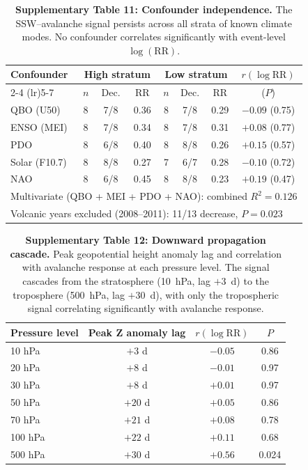 \begin{table}[!ht]
\centering
\caption{\textbf{Supplementary Table 11: Confounder independence.}
The SSW--avalanche signal persists across all strata of known climate modes. No confounder correlates significantly with event-level $\log(\mathrm{RR})$.}
\label{tab:confounders}
\small
\begin{tabular}{lccccccc}
\toprule
Confounder & \multicolumn{3}{c}{High stratum} & \multicolumn{3}{c}{Low stratum} & $r(\log\mathrm{RR})$ \\
\cmidrule(lr){2-4} \cmidrule(lr){5-7}
 & $n$ & Dec. & RR & $n$ & Dec. & RR & ($P$) \\
\midrule
QBO (U50) & 8 & 7/8 & 0.36 & 8 & 7/8 & 0.29 & $-0.09$ (0.75) \\
ENSO (MEI) & 8 & 7/8 & 0.34 & 8 & 7/8 & 0.31 & $+0.08$ (0.77) \\
PDO & 8 & 6/8 & 0.40 & 8 & 8/8 & 0.26 & $+0.15$ (0.57) \\
Solar (F10.7) & 8 & 8/8 & 0.27 & 7 & 6/7 & 0.28 & $-0.10$ (0.72) \\
NAO & 8 & 6/8 & 0.45 & 8 & 8/8 & 0.23 & $+0.19$ (0.47) \\
\midrule
\multicolumn{8}{l}{Multivariate (QBO + MEI + PDO + NAO): combined $R^2 = 0.126$} \\
\multicolumn{8}{l}{Volcanic years excluded (2008--2011): 11/13 decrease, $P = 0.023$} \\
\bottomrule
\end{tabular}
\end{table}

\begin{table}[!ht]
\centering
\caption{\textbf{Supplementary Table 12: Downward propagation cascade.}
Peak geopotential height anomaly lag and correlation with avalanche response at each pressure level. The signal cascades from the stratosphere (10~hPa, lag $+3$~d) to the troposphere (500~hPa, lag $+30$~d), with only the tropospheric signal correlating significantly with avalanche response.}
\label{tab:propagation}
\small
\begin{tabular}{lccc}
\toprule
Pressure level & Peak Z anomaly lag & $r(\log\mathrm{RR})$ & $P$ \\
\midrule
10 hPa & $+3$ d & $-0.05$ & 0.86 \\
20 hPa & $+8$ d & $-0.01$ & 0.97 \\
30 hPa & $+8$ d & $+0.01$ & 0.97 \\
50 hPa & $+20$ d & $+0.05$ & 0.86 \\
70 hPa & $+21$ d & $+0.08$ & 0.78 \\
100 hPa & $+22$ d & $+0.11$ & 0.68 \\
500 hPa & $+30$ d & $+0.56$ & 0.024 \\
\bottomrule
\end{tabular}
\end{table}


